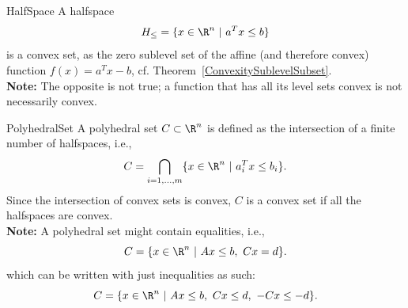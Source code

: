 \begin{ex}[Halfspace]{HalfSpace}
    A halfspace 
    \begin{equation*}
        H_{\leq} = \{ x \in \R^n \ | \ a^T x \leq b \}
    \end{equation*}
    is a convex set, as the zero sublevel set of the affine (and therefore convex) function $f(x) = a^T x - b$, cf. Theorem~\ref{ConvexitySublevelSubset}. \\

    \textbf{Note:} The opposite is not true; a function that has all its level sets convex is not necessarily convex.
\end{ex}

\begin{ex}{PolyhedralSet}
    A polyhedral set $C \subset \R^n$ is defined as the intersection of a finite number of halfspaces, i\@.e\@.,
    \begin{equation*}
        C = \bigcap_{i= 1, \ldots, m} \{ x \in \R^n \ | \ a_i^T x \leq b_i \}.
    \end{equation*}
    Since the intersection of convex sets is convex, $C$ is a convex set if all the halfspaces are convex. \\

    \textbf{Note:} A polyhedral set might contain equalities, i\@.e\@., 
    \begin{equation*}
        C = \{ x \in \R^n \ | \ Ax \leq b, \ Cx = d \}.
    \end{equation*}
    which can be written with just inequalities as such:
    \begin{equation*}
        C = \{ x \in \R^n \ | \ Ax \leq b, \ Cx \leq d, \ -Cx \leq -d \}.
    \end{equation*}
    \vspace*{-0.5cm}
\end{ex}

